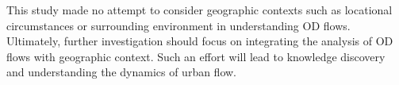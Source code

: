 \documentclass[a4paper,UKenglish]{lipics-v2018}
\begin{document}

This study made no attempt to consider geographic contexts such as locational circumstances or surrounding environment in understanding OD flows. Ultimately, further investigation should focus on integrating the analysis of OD flows with geographic context. Such an effort will lead to knowledge discovery and understanding the dynamics of urban flow.


%
%
%
%
%










\end{document}

